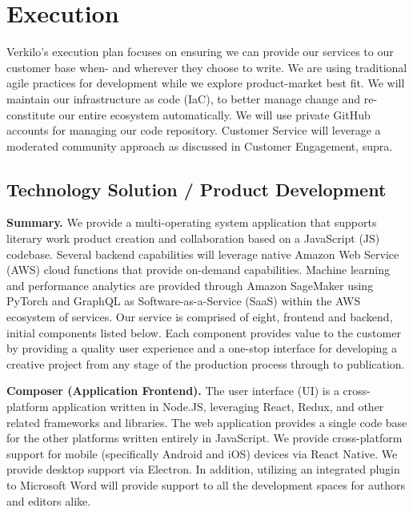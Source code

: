\documentclass[10pt,openany]{book}
\begin{document}
\hypertarget{execution}{%
\chapter{Execution}\label{execution}}

Verkilo's execution plan focuses on ensuring we can provide our services
to our customer base when- and wherever they choose to write. We are
using traditional agile practices for development while we explore
product-market best fit. We will maintain our infrastructure as code
(IaC), to better manage change and re-constitute our entire ecosystem
automatically. We will use private GitHub accounts for managing our code
repository. Customer Service will leverage a moderated community
approach as discussed in Customer Engagement, supra.

\hypertarget{technology-solution-product-development}{%
\section{Technology Solution / Product
Development}\label{technology-solution-product-development}}

\textbf{Summary.} We provide a multi-operating system application that
supports literary work product creation and collaboration based on a
JavaScript (JS) codebase. Several backend capabilities will leverage
native Amazon Web Service (AWS) cloud functions that provide on-demand
capabilities. Machine learning and performance analytics are provided
through Amazon SageMaker using PyTorch and GraphQL as
Software-as-a-Service (SaaS) within the AWS ecosystem of services. Our
service is comprised of eight, frontend and backend, initial components
listed below. Each component provides value to the customer by providing
a quality user experience and a one-stop interface for developing a
creative project from any stage of the production process through to
publication.

\textbf{Composer (Application Frontend).} The user interface (UI) is a
cross-platform application written in Node.JS, leveraging React, Redux,
and other related frameworks and libraries. The web application provides
a single code base for the other platforms written entirely in
JavaScript. We provide cross-platform support for mobile (specifically
Android and iOS) devices via React Native. We provide desktop support
via Electron. In addition, utilizing an integrated plugin to Microsoft
Word will provide support to all the development spaces for authors and
editors alike.
\end{document}

